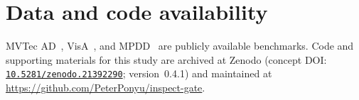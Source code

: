 \documentclass[11pt]{article}
\begin{document}
\section*{Data and code availability}
MVTec AD~\citep{bergmann2019mvtec}, VisA~\citep{zou2022spot}, and
MPDD~\citep{jezek2021mpdd} are publicly available benchmarks. Code and supporting materials
for this study are archived at Zenodo (concept DOI:
\href{https://doi.org/10.5281/zenodo.21392290}{\texttt{10.5281/zenodo.21392290}};
version~0.4.1) and maintained at \url{https://github.com/PeterPonyu/inspect-gate}.



\end{document}
